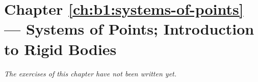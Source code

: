 \section*{Chapter \ref{ch:b1:systems-of-points} --- Systems of Points; Introduction to Rigid Bodies}


\emph{The exercises of this chapter have not been written yet.}
